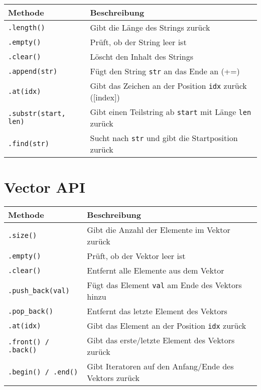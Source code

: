 \documentclass[10pt, a3paper, landscape]{article}
\begin{document}
\begin{multicols*}{4}
\noindent
\begin{tabularx}{\linewidth}{l >{\RaggedRight}X}
\toprule
\textbf{Methode} & \textbf{Beschreibung} \\
\midrule
\lstinline|.length()| & Gibt die Länge des Strings zurück \\
\lstinline|.empty()| & Prüft, ob der String leer ist \\
\lstinline|.clear()| & Löscht den Inhalt des Strings \\
\lstinline|.append(str)| & Fügt den String \lstinline|str| an das Ende an (+=) \\
\lstinline|.at(idx)| & Gibt das Zeichen an der Position \lstinline|idx| zurück ([index]) \\
\lstinline|.substr(start, len)| & Gibt einen Teilstring ab \lstinline|start| mit Länge \lstinline|len| zurück \\
\lstinline|.find(str)| & Sucht nach \lstinline|str| und gibt die Startposition zurück \\
\bottomrule
\end{tabularx}

\section{Vector API}

\noindent
\begin{tabularx}{\linewidth}{l >{\RaggedRight}X}
\toprule
\textbf{Methode} & \textbf{Beschreibung} \\
\midrule
\lstinline|.size()| & Gibt die Anzahl der Elemente im Vektor zurück \\
\lstinline|.empty()| & Prüft, ob der Vektor leer ist \\
\lstinline|.clear()| & Entfernt alle Elemente aus dem Vektor \\
\lstinline|.push_back(val)| & Fügt das Element \lstinline|val| am Ende des Vektors hinzu \\
\lstinline|.pop_back()| & Entfernt das letzte Element des Vektors \\
\lstinline|.at(idx)| & Gibt das Element an der Position \lstinline|idx| zurück \\
\lstinline|.front() / .back()| & Gibt das erste/letzte Element des Vektors zurück \\
\lstinline|.begin() / .end()| & Gibt Iteratoren auf den Anfang/Ende des Vektors zurück \\
\bottomrule
\end{tabularx}


\end{multicols*}
\end{document}
